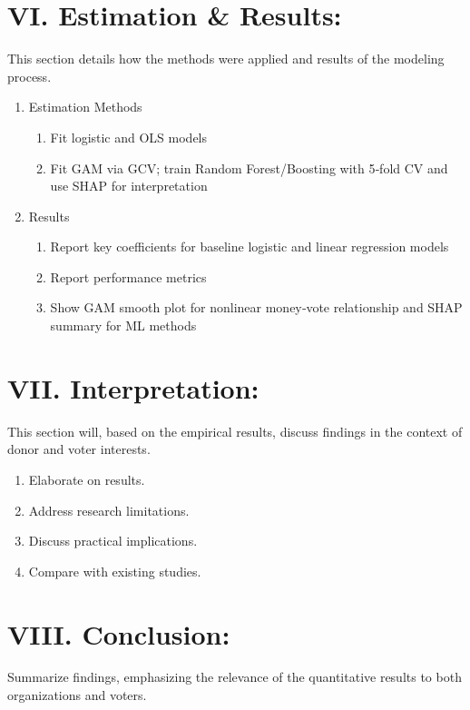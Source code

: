 \documentclass[12pt]{article}
\begin{document}
\section*{VI. Estimation \& Results:} This section details how the methods were applied and results of the modeling process. 

\begin{enumerate}[label=\Alph*.]
    \item Estimation Methods
    \begin{enumerate}[label=\arabic*)]
        \item Fit logistic and OLS models  
        \item Fit GAM via GCV; train Random Forest/Boosting with 5‑fold CV and use SHAP for interpretation
    \end{enumerate}

  \item Results
    \begin{enumerate}[label=\arabic*)]
      \item Report key coefficients for baseline logistic and linear regression models
      \item Report performance metrics 
      \item Show GAM smooth plot for nonlinear money‐vote relationship and SHAP summary for ML methods
    \end{enumerate}
\end{enumerate}

\section*{VII. Interpretation:} This section will, based on the empirical results, discuss findings in the context of donor and voter interests.

  \begin{enumerate}[label=\Alph*.]
    \item Elaborate on results.
    \item Address research limitations.
    \item Discuss practical implications.
    \item Compare with existing studies.
  \end{enumerate}

\section*{VIII. Conclusion:} Summarize findings, emphasizing the relevance of the quantitative results to both organizations and voters.

\nocite{*}


\end{document}
